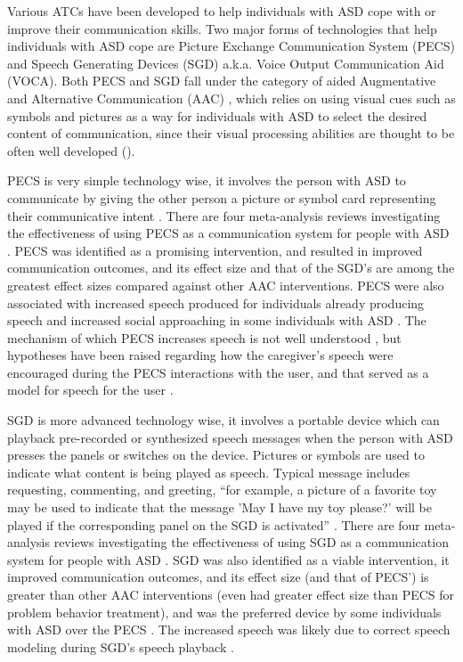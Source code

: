 \documentclass{ut-thesis}
\begin{document}
Various ATCs have been developed to help individuals with ASD cope with or improve their communication skills.  Two major forms of technologies that help individuals with ASD cope are Picture Exchange Communication System (PECS) and Speech Generating Devices (SGD) a.k.a. Voice Output Communication Aid (VOCA).  Both PECS and SGD fall under the category of aided Augmentative and Alternative Communication (AAC) \cite{sigafoos2001conditional}, which relies on using visual cues such as symbols and pictures as a way for individuals with ASD to select the desired content of communication, since their visual processing abilities are thought to be often well developed (\cite{mirenda2001autism, shane2012applying}).

PECS is very simple technology wise, it involves the person with ASD to communicate by giving the other person a picture or symbol card representing their communicative intent \cite{bondy1994picture}.  There are four meta-analysis reviews investigating the effectiveness of using PECS as a communication system for people with ASD \cite{ganz2012meta, ganz2012metab, sulzer2009picture, tincani2010quantitative}.  PECS was identified as a promising intervention, and resulted in improved communication outcomes, and its effect size and that of the SGD's are among the greatest effect sizes compared against other AAC interventions.  PECS were also associated with increased speech produced for individuals already producing speech and increased social approaching in some individuals with ASD \cite{lang2014assistive}.  The mechanism of which PECS increases speech is not well understood \cite{preston2009review}, but hypotheses have been raised regarding how the caregiver's speech were encouraged during the PECS interactions with the user, and that served as a model for speech for the user \cite{yoder2006randomized}.

SGD is more advanced technology wise, it involves a portable device which can playback pre-recorded or synthesized speech messages when the person with ASD presses the panels or switches on the device.  Pictures or symbols are used to indicate what content is being played as speech.  Typical message includes requesting, commenting, and greeting, ``for example, a picture of a favorite toy may be used to indicate that the message 'May I have my toy please?' will be played if the corresponding panel on the SGD is activated'' \cite{lang2014assistive}.  There are four meta-analysis reviews investigating the effectiveness of using SGD as a communication system for people with ASD \cite{van2010communication, van2011assessing, ganz2012metab, ganz2013moderation}.  SGD was also identified as a viable intervention, it improved communication outcomes, and its effect size (and that of PECS') is greater than other AAC interventions (even had greater effect size than PECS for problem behavior treatment), and was the preferred device by some individuals with ASD over the PECS \cite{lang2014assistive}.  The increased speech was likely due to correct speech modeling during SGD's speech playback \cite{schlosser2008effects}.
\end{document}
